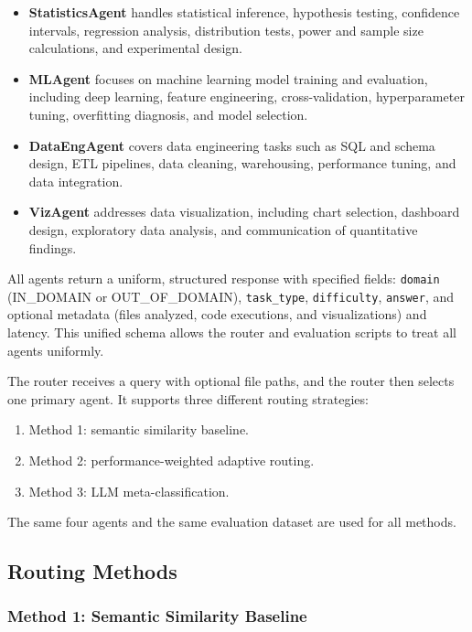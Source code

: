 \documentclass[11pt]{article}
\begin{document}
\begin{itemize}
    \item \textbf{StatisticsAgent} handles statistical inference, hypothesis testing, confidence intervals, regression analysis, distribution tests, power and sample size calculations, and experimental design.
    \item \textbf{MLAgent} focuses on machine learning model training and evaluation, including deep learning, feature engineering, cross-validation, hyperparameter tuning, overfitting diagnosis, and model selection.
    \item \textbf{DataEngAgent} covers data engineering tasks such as SQL and schema design, ETL pipelines, data cleaning, warehousing, performance tuning, and data integration.
    \item \textbf{VizAgent} addresses data visualization, including chart selection, dashboard design, exploratory data analysis, and communication of quantitative findings.
\end{itemize}

All agents return a uniform, structured response with specified fields: \texttt{domain} (IN\_DOMAIN or OUT\_OF\_DOMAIN), \texttt{task\_type}, \texttt{difficulty}, \texttt{answer}, and optional metadata (files analyzed, code executions, and visualizations) and latency. This unified schema allows the router and evaluation scripts to treat all agents uniformly.

The router receives a query with optional file paths, and the router then selects one primary agent. It supports three different routing strategies:

\begin{enumerate}
    \item Method 1: semantic similarity baseline.
    \item Method 2: performance-weighted adaptive routing.
    \item Method 3: LLM meta-classification.
\end{enumerate}

The same four agents and the same evaluation dataset are used for all methods.

\subsection{Routing Methods}

\subsubsection{Method 1: Semantic Similarity Baseline}
\end{document}

